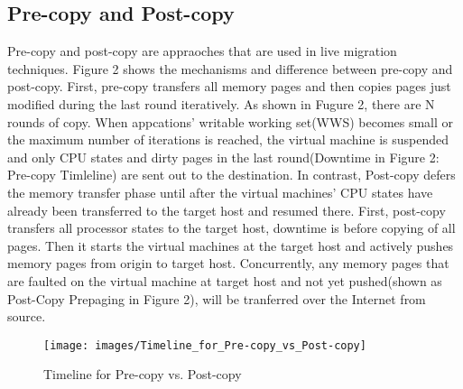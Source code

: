 \documentclass[runningheads]{llncs}
\begin{document}
\subsection{Pre-copy and Post-copy}
Pre-copy and post-copy are appraoches that are used in live migration techniques. Figure 2 shows the mechanisms and difference between pre-copy and post-copy. First, pre-copy transfers all memory pages and then copies pages just modified during the last round iteratively. As shown in Fugure 2, there are N rounds of copy. When appcations' writable working set(WWS) becomes small or the maximum number of iterations is reached, the virtual machine is suspended and only CPU states and dirty pages in the last round(Downtime in Figure 2: Pre-copy Timleline) are sent out to the destination. In contrast, Post-copy defers the memory transfer phase until after the virtual machines' CPU states have already been transferred to the target host and resumed there. First, post-copy transfers all processor states to the target host, downtime is before copying of all pages. Then it starts the virtual machines at the target host and actively pushes memory pages from origin to target host. Concurrently, any memory pages that are faulted on the virtual machine at target host and not yet pushed(shown as Post-Copy Prepaging in Figure 2), will be tranferred over the Internet from source.
\begin{figure}
\centering
\texttt{[image: images/Timeline\_for\_Pre-copy\_vs\_Post-copy]}
\caption{Timeline for Pre-copy vs. Post-copy}
\end{figure}
\end{document}
